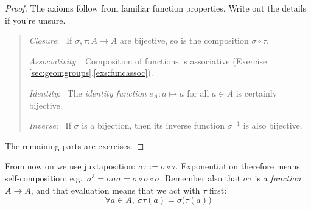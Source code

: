\begin{proof}
	\exstart The axioms follow from familiar function properties. Write out the details if you're unsure.\vspace{-5pt}
  \begin{quote}
		\emph{Closure}: \ If $\sigma,\tau:A\to A$ are bijective, so is the composition $\sigma\circ\tau$.\par
		\emph{Associativity}: \ Composition of functions is associative (Exercise \ref*{sec:geomgroups}.\ref{exs:funcassoc}).\par
		\emph{Identity}: \ The \emph{identity function} $e_A:a\mapsto a$ for all $a\in A$ is certainly bijective.\par
		\emph{Inverse}: \ If $\sigma$ is a bijection, then its inverse function $\sigma^{-1}$ is also bijective.
	\end{quote}
		The remaining parts are exercises.
\end{proof}

From now on we use juxtaposition: $\sigma\tau:=\sigma\circ\tau$. Exponentiation therefore means self-composition: e.g.\ $\sigma^3=\sigma\sigma\sigma=\sigma\circ\sigma\circ\sigma$. Remember also that $\sigma\tau$ is a \emph{function} $A\to A$, and that evaluation means that we act with $\tau$ first:
\[
	\forall a\in A, \ \sigma\tau(a)=\sigma\bigl(\tau(a)\bigr)
\]


\goodbreak


